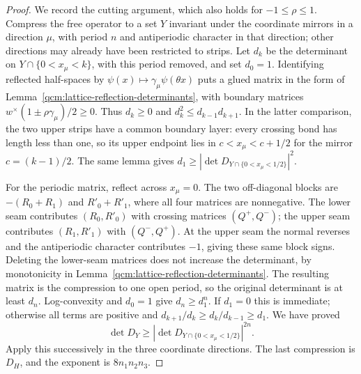 \documentclass[11pt,letterpaper,reqno]{amsart}
\theoremstyle{definition}
\begin{document}
\begin{proof}
We record the cutting argument, which also holds for
$-1\le\rho\le1$. Compress the free operator to a set $Y$ invariant
under the coordinate mirrors in a direction $\mu$, with period $n$
and antiperiodic character in that direction; other directions may
already have been restricted to strips. Let $d_k$ be the determinant
on $Y\cap\{0<x_\mu<k\}$, with this period removed, and set $d_0=1$.
Identifying reflected half-spaces by
$\psi(x)\mapsto\gamma_\mu\psi(\theta x)$ puts a glued matrix in the
form of Lemma~\ref{qcm:lattice-reflection-determinants}, with boundary
matrices $w^\times(1\pm\rho\gamma_\mu)/2\ge0$.
Thus $d_k\ge0$ and $d_k^2\le d_{k-1}d_{k+1}$. In the latter
comparison, the two upper strips have a common boundary layer:
every crossing bond has length less than one, so its upper endpoint
lies in $c<x_\mu<c+1/2$ for the mirror $c=(k-1)/2$.
The same lemma gives
$d_1\ge|\det D_{Y\cap\{0<x_\mu<1/2\}}|^2$.

For the periodic matrix, reflect across $x_\mu=0$. The two
off-diagonal blocks are $-(R_0+R_1)$ and $R'_0+R'_1$, where all
four matrices are nonnegative. The lower seam contributes
$(R_0,R'_0)$ with crossing matrices $(Q^+,Q^-)$; the upper seam
contributes $(R_1,R'_1)$ with $(Q^-,Q^+)$. At the upper seam the
normal reverses and the antiperiodic character contributes $-1$,
giving these same block signs. Deleting the lower-seam matrices
does not increase the determinant, by monotonicity in
Lemma~\ref{qcm:lattice-reflection-determinants}. The resulting matrix
is the compression to one open period, so the original determinant
is at least $d_n$. Log-convexity and $d_0=1$ give $d_n\ge d_1^n$.
If $d_1=0$ this is immediate; otherwise all terms are positive and
$d_{k+1}/d_k\ge d_k/d_{k-1}\ge d_1$.
We have proved
\[
 \det D_Y\ge
 |\det D_{Y\cap\{0<x_\mu<1/2\}}|^{2n}.
\]
Apply this successively in the three coordinate directions. The last
compression is $D_H$, and the exponent is $8n_1n_2n_3$.


\end{proof}
\end{document}
